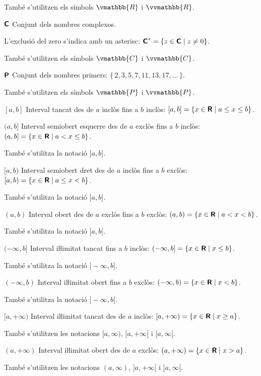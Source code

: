 \begin{list}{}
	 També s'utilitzen els símbols $\vmathbb{R}$ i $\vvmathbb{R}$.
	 
	\item[${\boldsymbol{\mathsf{C}}}$] Conjunt dels nombres complexos.  
	
	L'exclusió del zero s'indica amb un asterisc: ${\boldsymbol{\mathsf{C}}}^* = \{ z \in {\ensuremath{\boldsymbol{\mathsf{C}}}} \mid z \ne 0 \}$.
	
	 També s'utilitzen els símbols $\vmathbb{C}$ i $\vvmathbb{C}$.
	 
	 \item[${\boldsymbol{\mathsf{P}}}$] Conjunt dels nombres primers: $\{\,2,3,5,7,11,13,17,\ldots\,\}$. 
	 
	 També s'utilitzen els símbols $\vmathbb{P}$ i $\vvmathbb{P}$.
	 
	 \item[{$[a,b]$}] Interval tancat des de $a$ inclòs fins a $b$ inclòs: $[a,b] = \{x \in {\ensuremath{\boldsymbol{\mathsf{R}}}} \mid a \leq x \leq b\}$.
	 
	 \item[{$(a,b]$}] Interval semiobert esquerre des de $a$ exclòs fins a $b$ inclòs: $(a,b] = \{x \in {\ensuremath{\boldsymbol{\mathsf{R}}}} \mid a < x \leq b\}$. 
	 
	 També s'utilitza la notació $]a,b]$.
	 
	 \item[{$[a,b)$}] Interval semiobert dret des de $a$ inclòs fins a $b$ exclòs: $[a,b) = \{x \in {\ensuremath{\boldsymbol{\mathsf{R}}}} \mid a \leq x < b\}$. 
	 
	 També s'utilitza la notació $[a,b[$.
	 
	 \item[{$(a,b)$}] Interval obert des de $a$ exclòs fins a $b$ exclòs: $(a,b) = \{x \in {\ensuremath{\boldsymbol{\mathsf{R}}}} \mid a < x < b\}$. 
	 
	 També s'utilitza la notació $]a,b[$.
	 
	 \item[{$(-\infty,b]$}] Interval iŀlimitat tancat fins a $b$ inclòs: $(-\infty,b] = \{x \in {\ensuremath{\boldsymbol{\mathsf{R}}}} \mid x \leq b\}$.  
	 
	 També s'utilitza la notació $]-\infty,b]$.
	 
	 \item[{$(-\infty,b)$}] Interval iŀlimitat obert fins a $b$ exclòs: $(-\infty,b) = \{x \in {\ensuremath{\boldsymbol{\mathsf{R}}}} \mid x < b\}$. 
	 
	 També s'utilitza la notació $]-\infty,b[$.
	 
	 \item[{$[a,+\infty)$}] Interval iŀlimitat tancat des de $a$ inclòs: $[a, +\infty) = \{x \in {\ensuremath{\boldsymbol{\mathsf{R}}}} \mid  x \geq a\}$. 
	 
	 També s'utilitzen les notacions $[a, \infty)$, $[a, +\infty[$ i $[a, \infty[$.

	\item[{$(a,+\infty)$}] Interval iŀlimitat obert des de $a$ exclòs: $(a, +\infty) = \{x \in {\ensuremath{\boldsymbol{\mathsf{R}}}} \mid  x > a\}$. 
	
	També s'utilitzen les notacions $(a, \infty)$, $]a, +\infty[$ i $]a, \infty[$.
\end{list}
 
 
 
 
 


